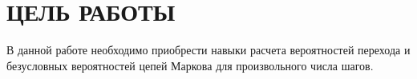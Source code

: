 \section{ЦЕЛЬ РАБОТЫ}

В данной работе необходимо приобрести навыки расчета вероятностей перехода
и безусловных вероятностей цепей Маркова для произвольного числа шагов.